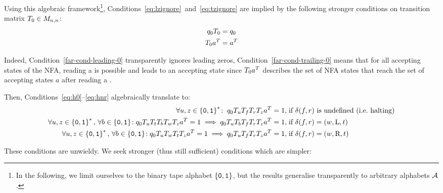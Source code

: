 Using this algebraic framework\footnote{In the following, we limit ourselves to the binary tape alphabet $\left\{\texttt{0},\texttt{1}\right\}$, but the results generalise transparently to arbitrary alphabets $\mathcal{A}$.}, Conditions~\eqref{eq:lzignore}~and~\eqref{eq:tzignore} are implied by the following stronger conditions on transition matrix $T_0 \in M_{n,n}$:
\begin{align}
    q_0 T_0 & = q_0
    \label{far-cond-leading-0}
    \\
    T_0 a^{T} & = a^{T}
    \label{far-cond-trailing-0}
\end{align}

Indeed, Condition~\eqref{far-cond-leading-0} transparently ignores leading zeros, Condition~\eqref{far-cond-trailing-0} means that for all accepting states of the NFA, reading a \szero is possible and leads to an accepting state since $T_0 a^{T}$ describes the set of NFA states that reach the set of accepting states $a$ after reading a \szero.

Then, Conditions~\eqref{eq:h0}--\eqref{eq:hnr} algebraically translate to:
{\small
\begin{align*}
    \forall u,z\in\left\{\texttt{0},\texttt{1}\right\}^*\!: \; q_0 T_u T_f T_r T_z a^{T} = 1, \;                                                                             & \text{if $\delta(f,r)$ is undefined (i.e.~halting)}
    \\
    \forall u,z\in\left\{\texttt{0},\texttt{1}\right\}^*,\,\forall b \in \left\{\texttt{0},\texttt{1}\right\}\!: q_0 T_{u} T_t T_b T_w T_{z} a^{T} = 1 \implies q_0 T_{u} T_b T_f T_r T_{z} a^{T} = 1,\; & \text{if $\delta(f,r) = (w,\text{L},t)$}
    \\
    \forall u,z\in\left\{\texttt{0},\texttt{1}\right\}^*,\,\forall b \in \left\{\texttt{0},\texttt{1}\right\}\!: q_0 T_{u} T_w T_t T_{z} a^{T} = 1 \implies q_0 T_{u} T_f T_r T_{z} a^{T} = 1,\;         & \text{if $\delta(f,r) = (w,\text{R},t)$}
\end{align*}
}

These conditions are unwieldy. We seek stronger (thus still sufficient) conditions which are simpler:

